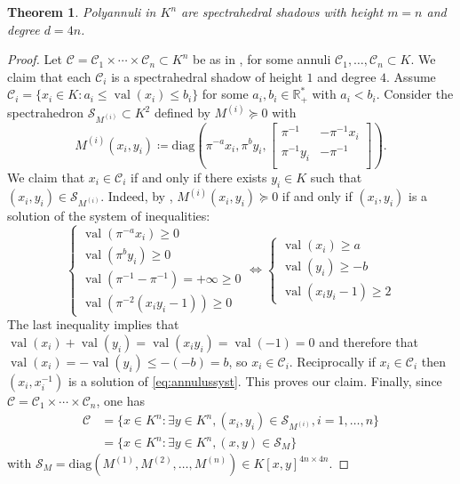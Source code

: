 \documentclass[sigconf]{acmart}
\newcommand{\R}{\mathbb{R}} %
\newtheorem{theorem}{Theorem}[section]
\DeclareMathOperator{\val}{val}
\def\diag{\mathrm{diag}}
\begin{document}
\begin{theorem}
Polyannuli in $K^n$ are spectrahedral shadows with height $m=n$ and degree $d=4n$.
\end{theorem}
\begin{proof}
  Let $\mathcal{C} = \mathcal{C}_1 \times \cdots \times \mathcal{C}_n \subset K^n$ be as in ,
  for some annuli $\mathcal{C}_1,\ldots,\mathcal{C}_n \subset K$. We claim that each $\mathcal{C}_i$ is a spectrahedral
  shadow of height $1$ and degree $4$. Assume $\mathcal{C}_i = \{x_i \in K : a_i \leq \val(x_i) \leq b_i\}$
  for some $a_i, b_i \in \R^*_+$ with $a_i < b_i$. Consider the spectrahedron
  $\mathcal{S}_{M^{(i)}} \subset K^2$ defined by $M^{(i)} \succeq 0$ with
  $$
  M^{(i)}(x_i,y_i) \coloneq \diag\left(\pi^{-a} x_i, \pi^{b} y_i,
  \begin{bmatrix}
    \pi^{-1} & -\pi^{-1} x_i  \\
    \pi^{-1} y_i & - \pi^{-1} \\
  \end{bmatrix}\right).
  $$
  We claim that $x_i \in \mathcal{C}_i$ if and only if there exists $y_i \in K$ such that $(x_i,y_i) \in
  \mathcal{S}_{M^{(i)}}$.
  Indeed, by , $M^{(i)}(x_i,y_i) \succeq 0$ if and only if $(x_i,y_i)$ is a solution of the system
  of inequalities:
  \begin{equation}
    \label{eq:annulussyst}
    \begin{cases}
      \val(\pi^{-a} x_i) \ge 0 \\
  \val(\pi^{b} y_i) \ge 0\\
  \val(\pi^{-1}- \pi^{-1}) = +\infty \ge 0\\
  \val(\pi^{-2}\left( x_iy_i-1 \right))  \ge 0 
\end{cases}
\iff	
\begin{cases} 
  \val\left(x_i\right)\ge a\\
  \val\left(y_i\right)\ge -b\\
  \val\left(x_iy_i-1 \right) \ge 2
\end{cases}
\end{equation} 
  The last inequality implies that $\val\left(x_i\right)+\val\left(y_i\right)=\val\left(x_iy_i\right) = \val\left(-1\right) =0$ and therefore that $\val\left(x_i\right)=-\val\left(y_i\right)\le -(-b) = b$, so $x_i \in \mathcal{C}_i$. 
Reciprocally if $x_i \in \mathcal{C}_i$ then $(x_i,x_i^{-1})$ is a solution of \eqref{eq:annulussyst}.
This proves our claim.
Finally, since $\mathcal{C} = \mathcal{C}_1 \times \cdots \times \mathcal{C}_n$, one has
\begin{equation*}
  \begin{aligned}
    \mathcal{C} &=
    \{x \in K^n : \exists y  \in K^n, (x_i,y_i) \in
    \mathcal{S}_{M^{(i)}}, i=1,\ldots,n\} \\
    &= \{x \in K^n : \exists y \in K^n, (x,y) \in \mathcal{S}_M\}
  \end{aligned}
\end{equation*}
with $\mathcal{S}_M = \diag(M^{(1)}, M^{(2)}, \ldots, M^{(n)}) \in K[x,y]^{4n \times 4n}.$
\end{proof}
\end{document}
